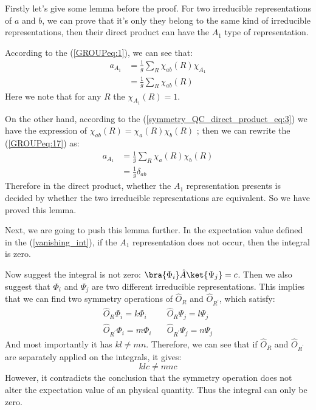 Firstly let's give some lemma before the proof. For two irreducible
representations of $a$ and $b$, we can prove that it's only they
belong to the same kind of irreducible representations, then their
direct product can have the $A_{1}$ type of representation.

According to the (\ref{GROUPeq:1}), we can see that:
\begin{align}\label{GROUPeq:17}
  a_{A_{1}} &= \frac{1}{g}\sum_{R}\chi_{ab}(R)\chi_{A_{1}} \nonumber
  \\
  &=\frac{1}{g}\sum_{R}\chi_{ab}(R)
\end{align}
Here we note that for any $R$ the $\chi_{A_{1}}(R) = 1$.

On the other hand, according to the (\ref{symmetry_QC_direct_product_eq:3}) we
have the expression of $\chi_{ab}(R) = \chi_{a}(R)\chi_{b}(R)$ ; then we can
rewrite the (\ref{GROUPeq:17}) as:
\begin{align}\label{}
  a_{A_{1}} &= \frac{1}{g}\sum_{R}\chi_{a}(R)\chi_{b}(R) \nonumber
  \\
  &=\frac{1}{g}\delta_{ab}
\end{align}
Therefore in the direct product, whether the $A_{1}$ representation
presents is decided by whether the two irreducible representations are
equivalent. So we have proved this lemma.

Next, we are going to push this lemma further. In the expectation
value defined in the (\ref{vanishing_int}), if the $A_{1}$ representation
does not occur, then the integral is zero.

Now suggest the integral is not zero:
$\bra{\Phi_{i}}\hat{A}\ket{\Psi_{j}} = c$. Then we also suggest that
$\Phi_{i}$ and $\Psi_{j}$ are two different irreducible
representations. This implies that we can find two symmetry operations
of $\hat{O}_{R}$ and $\hat{O}_{R^{'}}$, which satisfy:
\begin{align}\label{}
  \hat{O}_{R}\Phi_{i} = k\Phi_{i} &\quad \hat{O}_{R}\Psi_{j}=l\Psi_{j}
  \nonumber \\
  \hat{O}_{R^{'}}\Phi_{i} = m\Phi_{i} &\quad \hat{O}_{R^{'}}\Psi_{j}
  =n\Psi_{j}
\end{align}
And most importantly it has $kl \neq mn$. Therefore, we can see that
if $\hat{O}_{R}$ and $\hat{O}_{R^{'}}$ are separately applied on the
integrals, it gives:
\begin{equation}\label{}
  klc \neq mnc
\end{equation}
However, it contradicts the conclusion that the symmetry operation
does not alter the expectation value of an physical quantity. Thus the
integral can only be zero.




